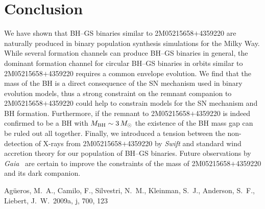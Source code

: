 \documentclass[twocolumn,tighten]{aastex61}
\newcommand{\msun}{{M_\odot}}
\newcommand{\gaia}{{\it Gaia} }
\newcommand{\katie}[1]{\textbf{\color{purple} Katie: #1}}
\begin{document}



\section{Conclusion}
\label{S:Conclusion}
We have shown that BH--GS binaries similar to 2M05215658$+$4359220 are naturally produced in binary population synthesis simulations for the Milky Way. While several formation channels can produce BH--GS binaries in general, the dominant formation channel for circular BH--GS binaries in orbits similar to 2M05215658$+$4359220 requires a common envelope evolution. We find that the mass of the BH is a direct consequence of the SN mechanism used in binary evolution models, thus a strong constraint on the remnant companion to 2M05215658$+$4359220 could help to constrain models for the SN mechanism and BH formation. Furthermore, if the remnant to 2M05215658$+$4359220 is indeed confirmed to be a BH with $M_{\rm{BH}}\sim3\,\msun$ the existence of the BH mass gap can be ruled out all together. Finally, we introduced a tension between the non-detection of X-rays from 2M05215658$+$4359220 by \textit{Swift} and standard wind accretion theory for our population of BH--GS binaries. Future observations by \gaia\ are certain to improve the constraints of the mass of 2M05215658$+$4359220 and its dark companion.


\begin{thebibliography}{}


 Ag\"ueros, M.~A., Camilo, F., Silvestri, N.~M., Kleinman, S.~J., Anderson, S.~F., Liebert, J.~W.\ 2009a, \ap
j, 700, 123

\end{thebibliography}
\end{document}

